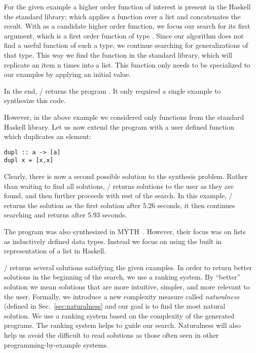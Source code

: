 For the given example a higher order function of interest is present in the Haskell the standard library;  which applies a function over a list and concatenates the result.
With  as a candidate higher order function, we focus
 our search for its first argument, which is a first order function of type .
Since our algorithm does not find a useful function of such a type, we continue searching for generalizations of that type.
This way we find the function  in the standard library, which will replicate an item n times into a list.
This function only needs to be specialized to our examples by applying an initial value.

In the end, \ourTool/ returns the program . It only required a single example to synthesize this code.

However, in the above example we considered only functions from the standard Haskell library. Let us now extend the program with a user defined function  which duplicates an element:
\begin{lstlisting}
dupl :: a -> [a]
dupl x = [x,x]
\end{lstlisting}

Clearly, there is now a second possible solution to the synthesis problem.
Rather than waiting to find all solutions, \ourTool/ returns solutions to the user as they are found, and then further proceeds with rest of the search.
In this example, \ourTool/ returns the solution  as the first solution after 5.26 seconds, it then continues searching and returns  after 5.93 seconds.

The  program was also synthesized in MYTH~\cite{Osera:2015}. However, their focus was on lists as inductively defined data types. 
Instead we focus on using the built in representation of a list in Haskell.

\ourTool/ returns several solutions satisfying the given examples. In
 order to return better solutions in the beginning of the search, we use a ranking system. By ``better'' solution we mean solutions that are more intuitive, simpler, and more relevant to the user. Formally, we introduce a new complexity measure called \textit{naturalness} (defined in 
Sec.~\ref{sec:naturalness} and our goal is to find the most natural solution. We use a ranking system based on the complexity of the 
generated programs. The ranking system helps to guide our search.
Naturalness will also help us avoid the difficult to read solutions as those often seen in other programming-by-example systems.



